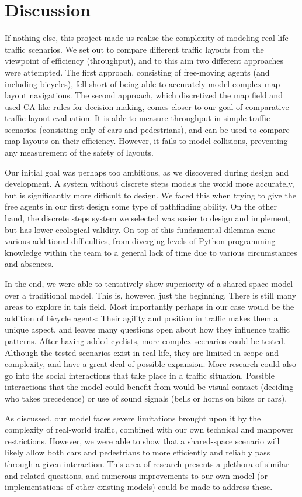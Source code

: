 \chapter{Discussion} \label{chap:discussion}

If nothing else, this project made us realise the complexity of modeling real-life traffic scenarios. We set out to compare different traffic layouts from the viewpoint of efficiency (throughput), and to this aim two different approaches were attempted. The first approach, consisting of free-moving agents (and including bicycles), fell short of being able to accurately model complex map layout navigations. The second approach, which discretized the map field and used CA-like rules for decision making, comes closer to our goal of comparative traffic layout evaluation. It is able to measure throughput in simple traffic scenarios (consisting only of cars and pedestrians), and can be used to compare map layouts on their efficiency. However, it fails to model collisions, preventing any measurement of the safety of layouts.

Our initial goal was perhaps too ambitious, as we discovered during design and development. A system without discrete steps models the world more accurately, but is significantly more difficult to design. We faced this when trying to give the free agents in our first design some type of pathfinding ability. On the other hand, the discrete steps system we selected was easier to design and implement, but has lower ecological validity. On top of this fundamental dilemma came various additional difficulties, from diverging levels of Python programming knowledge within the team to a general lack of time due to various circumstances and absences.

In the end, we were able to tentatively show superiority of a shared-space model over a traditional model. This is, however, just the beginning. There is still many areas to explore in this field. Most importantly perhaps in our case would be the addition of bicycle agents: Their agility and position in traffic makes them a unique aspect, and leaves many questions open about how they influence traffic patterns. After having added cyclists, more complex scenarios could be tested. Although the tested scenarios exist in real life, they are limited in scope and complexity, and have a great deal of possible expansion. More research could also go into the social interactions that take place in a traffic situation. Possible interactions that the model could benefit from would be visual contact (deciding who takes precedence) or use of sound signals (bells or horns on bikes or cars).

As discussed, our model faces severe limitations brought upon it by the complexity of real-world traffic, combined with our own technical and manpower restrictions. However, we were able to show that a shared-space scenario will likely allow both cars and pedestrians to more efficiently and reliably pass through a given interaction. This area of research presents a plethora of similar and related questions, and numerous improvements to our own model (or implementations of other existing models) could be made to address these.
